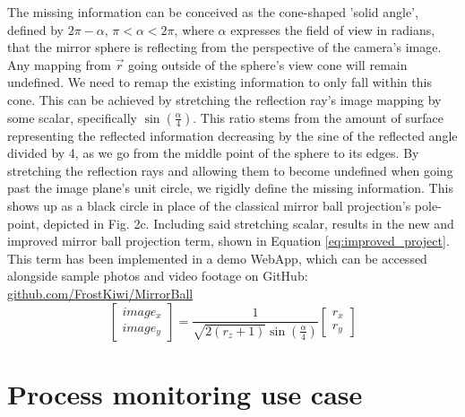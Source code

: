 \documentclass[10pt]{article}
\begin{document}
\begin{multicols}{2}
The missing information can be conceived as the cone-shaped 'solid angle', defined by $2\pi-\alpha$, $\pi<\alpha<2\pi$, where $\alpha$ expresses the field of view in radians, that the mirror sphere is reflecting from the perspective of the camera's image. Any mapping from $\vec{r}$ going outside of the sphere's view cone will remain undefined. We need to remap the existing information to only fall within this cone. This can be achieved by stretching the reflection ray's image mapping by some scalar, specifically $\sin{\left(\frac{\alpha}{4}\right)}$. This ratio stems from the amount of surface representing the reflected information decreasing by the sine of the reflected angle divided by 4, as we go from the middle point of the sphere to its edges. By stretching the reflection rays and allowing them to become undefined when going past the image plane's unit circle, we rigidly define the missing information. This shows up as a black circle in place of the classical mirror ball projection's pole-point, depicted in Fig. 2c. Including said stretching scalar, results in the new and improved mirror ball projection term, shown in Equation \ref{eq:improved_project}. This term has been implemented in a demo WebApp, which can be accessed alongside sample photos and video footage on GitHub: \href{https://github.com/FrostKiwi/MirrorBall}{github.com/FrostKiwi/MirrorBall}
\begin{equation}\label{eq:improved_project}
	\begin{bmatrix} image_x \\ image_y \end{bmatrix}=\frac{1}{\sqrt{2(r_z+1)}\sin{\left(\frac{\alpha}{4}\right)}}\begin{bmatrix} r_x \\ r_y \end{bmatrix}
\end{equation}
 \section{Process monitoring use case}


\end{multicols}
\end{document}
